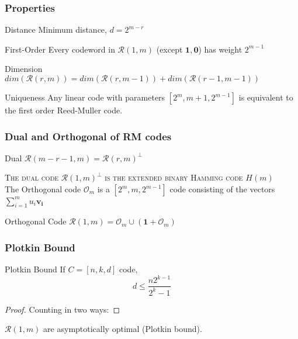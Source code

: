 \documentclass[xcolor=xvgnames]{beamer}
\newcommand{\RM}[2]{\ensuremath{\mathcal{R}(#1,#2)}}
\newcommand{\rem}{Reed-Muller}
\newcommand{\V}[1]{\ensuremath{\mathbf{#1}}}
\begin{document}

\begin{frame}
 \frametitle{Properties}
\begin{block}{Distance}
Minimum distance, $d=2^{m-r}$
\end{block}

\begin{block}{First-Order}
\label{equidistant}
Every codeword in $\RM{1}{m}$ (except $\V{1}, \V{0}$) has weight $2^{m-1}$
\end{block}

\begin{block}{Dimension}
   $   dim(\RM{r}{m}) = dim(\RM{r}{m-1}) + dim(\RM{r-1}{m-1})$
\end{block}

\begin{block}{Uniqueness}
Any linear code with parameters $[2^m, m+1, 2^{m-1}]$ is equivalent to the first order \rem{} code.
\end{block}

\end{frame}


\begin{frame}
\frametitle{Dual and Orthogonal of RM codes}
\begin{block}{Dual}
  $ \RM{m-r-1}{m} = \RM{r}{m}^{\bot} $
\end{block}

\textsc{The dual code $\RM{1}{m}^{\bot}$ is the extended binary Hamming code $H(m)$}
\\
The \alert{Orthogonal code} $\mathcal{O}_m$ is a $[2^m, m, 2^{m-1}]$
code consisting of the vectors $ \sum_{i=1}^m{u_i\V{v_i}} $ 

\begin{block}{Orthogonal Code}
  $\RM{1}{m} = \mathcal{O}_m \cup (\V{1} + \mathcal{O}_m)$
\end{block}

\end{frame}


\begin{frame}
 \frametitle{Plotkin Bound}

\begin{block}{Plotkin Bound}
    If $C = [n,k,d]$ code, \begin{equation*}
d \leq \frac{n2^{k-1}}{2^k - 1}
\end{equation*}
\end{block}
  \begin{proof}
Counting in two ways:
\end{proof}

$\RM{1}{m}$ are asymptotically optimal (Plotkin bound).

\end{frame}
\end{document}
